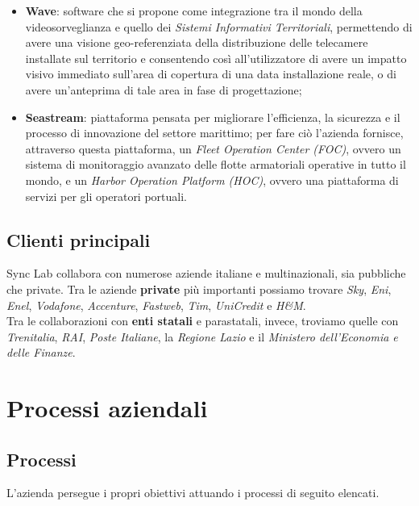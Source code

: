\begin{itemize}
  \item \textbf{Wave}: software che si propone come integrazione tra il mondo della videosorveglianza e quello dei \textit{Sistemi Informativi Territoriali}, permettendo di avere una visione geo-referenziata della distribuzione delle telecamere installate sul territorio e consentendo così all'utilizzatore di avere un impatto visivo immediato sull'area di copertura di una data installazione reale, o di avere un'anteprima di tale area in fase di progettazione;

  \item \textbf{Seastream}: piattaforma pensata per migliorare l'efficienza, la sicurezza e il processo di innovazione del settore marittimo; per fare ciò l'azienda fornisce, attraverso questa piattaforma, un \textit{Fleet Operation Center (FOC)}, ovvero un sistema di monitoraggio avanzato delle flotte armatoriali operative in tutto il mondo, e un \textit{Harbor Operation Platform (HOC)}, ovvero una piattaforma di servizi per gli operatori portuali. \\

\end{itemize}

\subsection*{Clienti principali}
Sync Lab collabora con numerose aziende italiane e multinazionali, sia pubbliche che private. Tra le aziende \textbf{private} più importanti possiamo trovare \textit{Sky}, \textit{Eni}, \textit{Enel}, \textit{Vodafone}, \textit{Accenture}, \textit{Fastweb}, \textit{Tim}, \textit{UniCredit} e \textit{H\&M}. \\
Tra le collaborazioni con \textbf{enti statali} e parastatali, invece, troviamo quelle con \textit{Trenitalia}, \textit{RAI}, \textit{Poste Italiane}, la \textit{Regione Lazio} e il \textit{Ministero dell'Economia e delle Finanze}.

\section{Processi aziendali}

\subsection{Processi}

L'azienda persegue i propri obiettivi attuando i processi di seguito elencati.

